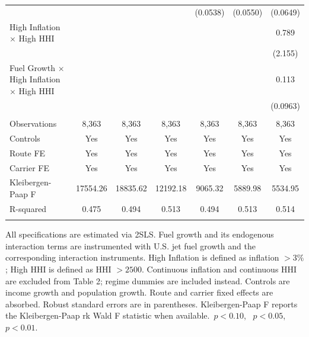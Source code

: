\begin{table}
\begin{tabular}{l*{6}{c}}
                    &                     &                     &                     &    (0.0538)         &    (0.0550)         &    (0.0649)         \\
High Inflation $\times$ High HHI&                     &                     &                     &                     &                     &       0.789         \\
                    &                     &                     &                     &                     &                     &     (2.155)         \\
Fuel Growth $\times$ High Inflation $\times$ High HHI&                     &                     &                     &                     &                     &       0.113         \\
                    &                     &                     &                     &                     &                     &    (0.0963)         \\
\hline \\[-1.8ex]
Observations        &       8,363         &       8,363         &       8,363         &       8,363         &       8,363         &       8,363         \\
Controls            &         Yes         &         Yes         &         Yes         &         Yes         &         Yes         &         Yes         \\
Route FE            &         Yes         &         Yes         &         Yes         &         Yes         &         Yes         &         Yes         \\
Carrier FE          &         Yes         &         Yes         &         Yes         &         Yes         &         Yes         &         Yes         \\
Kleibergen-Paap F   &    17554.26         &    18835.62         &    12192.18         &     9065.32         &     5889.98         &     5534.95         \\
R-squared           &       0.475         &       0.494         &       0.513         &       0.494         &       0.513         &       0.514         \\
\hline \\[-1.8ex]
\end{tabular}
\begin{tablenotes}[Note]
All specifications are estimated via 2SLS. Fuel growth and its endogenous interaction terms are instrumented with U.S. jet fuel growth and the corresponding interaction instruments. High Inflation is defined as inflation $>3\%$; High HHI is defined as HHI $>2500$. Continuous inflation and continuous HHI are excluded from Table 2; regime dummies are included instead. Controls are income growth and population growth. Route and carrier fixed effects are absorbed. Robust standard errors are in parentheses. Kleibergen-Paap F reports the Kleibergen-Paap rk Wald F statistic when available.\sym{*}~$p<0.10$, \sym{**}~$p<0.05$, \sym{***}~$p<0.01$.
\end{tablenotes}
\end{table}
